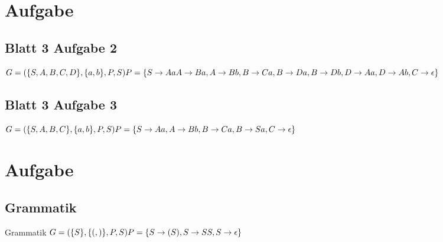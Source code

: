 \documentclass[a4paper,12pt,titlepage]{article}
\begin{document}
\section{Aufgabe}
\subsection{Blatt 3 Aufgabe 2}
$G = (\{S, A, B, C, D\}, \{a, b\}, P, S)\\
P = \{\\
S \rightarrow Aa\\
A \rightarrow Ba,\\
A \rightarrow Bb,\\
B \rightarrow Ca,\\
B \rightarrow Da,\\
B \rightarrow Db,\\
D \rightarrow Aa,\\
D \rightarrow Ab,\\
C \rightarrow \epsilon\\
\}$
\subsection{Blatt 3 Aufgabe 3}
$G = (\{S, A, B, C\}, \{a, b\}, P, S)\\
P = \{\\
S \rightarrow Aa,\\
A \rightarrow Bb,\\
B \rightarrow Ca,\\ 
B \rightarrow Sa,\\
C \rightarrow \epsilon\\
\}$
\section{Aufgabe}
\subsection{Grammatik}
Grammatik $G = (\{S\}, \{(, )\}, P, S)\\
P = \{\\
S \rightarrow (S),\\
S \rightarrow SS,\\
S \rightarrow \epsilon\\
\}$
\end{document}

